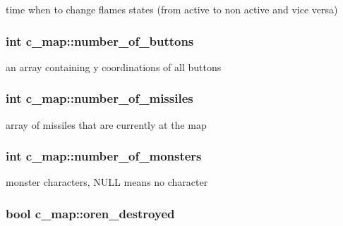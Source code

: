 time when to change flames states (from active to non active and vice versa) \hypertarget{classc__map_af36d349e1b651e72551f361b88cb9a76}{
\subsubsection[{number\-\_\-of\-\_\-buttons}]{\setlength{\rightskip}{0pt plus 5cm}int c\-\_\-map\-::number\-\_\-of\-\_\-buttons\hspace{0.3cm}{\ttfamily [protected]}}}\label{classc__map_af36d349e1b651e72551f361b88cb9a76}
an array containing y coordinations of all buttons \hypertarget{classc__map_a83302b5feea5bc2e3e9bc10efa23396f}{
\subsubsection[{number\-\_\-of\-\_\-missiles}]{\setlength{\rightskip}{0pt plus 5cm}int c\-\_\-map\-::number\-\_\-of\-\_\-missiles\hspace{0.3cm}{\ttfamily [protected]}}}\label{classc__map_a83302b5feea5bc2e3e9bc10efa23396f}
array of missiles that are currently at the map \hypertarget{classc__map_aab102e2ce55754d739b6679740f97a7c}{
\subsubsection[{number\-\_\-of\-\_\-monsters}]{\setlength{\rightskip}{0pt plus 5cm}int c\-\_\-map\-::number\-\_\-of\-\_\-monsters\hspace{0.3cm}{\ttfamily [protected]}}}\label{classc__map_aab102e2ce55754d739b6679740f97a7c}
monster characters, N\-U\-L\-L means no character \hypertarget{classc__map_af471bb004fc765a15293604a0830bca2}{
\subsubsection[{oren\-\_\-destroyed}]{\setlength{\rightskip}{0pt plus 5cm}bool c\-\_\-map\-::oren\-\_\-destroyed\hspace{0.3cm}{\ttfamily [protected]}}}\label{classc__map_af471bb004fc765a15293604a0830bca2}
